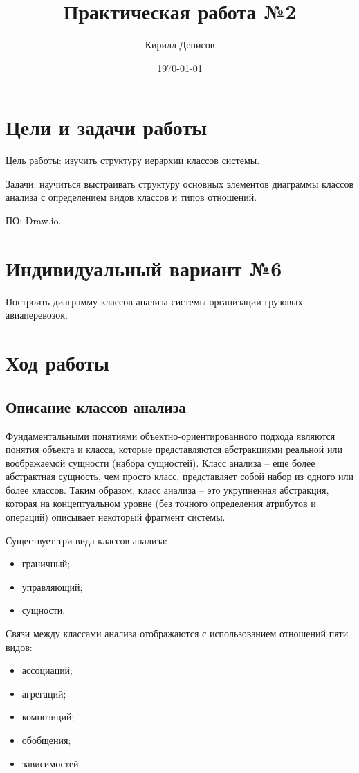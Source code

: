 \documentclass[a4paper,14pt]{extarticle}
\author{Кирилл Денисов}
\title{Практическая работа №2}
\date{\today}
\newcommand{\pathToCommonFolder}{/home/denilai/Desktop/LaTeX/Common}
\begin{document}
\thispagestyle{empty}



\newpage
\tableofcontents
\newpage	
\section{Цели и задачи работы}
Цель работы: изучить структуру иерархии классов системы.

Задачи: научиться выстраивать структуру основных элементов диаграммы
классов анализа с определением видов классов и типов отношений.

ПО: Draw.io.
\section{Индивидуальный вариант №6}
Построить диаграмму классов анализа системы организации грузовых авиаперевозок.
\section{Ход работы}
\subsection{Описание классов анализа}
Фундаментальными понятиями объектно-ориентированного подхода являются понятия объекта и класса, которые представляются абстракциями реальной или воображаемой сущности (набора сущностей). Класс анализа – еще более абстрактная сущность, чем просто класс, представляет собой набор из одного или более классов.
Таким образом, класс анализа – это укрупненная абстракция, которая на концептуальном уровне (без точного определения атрибутов и операций) описывает некоторый фрагмент системы.

Существует три вида классов анализа:
\begin{itemize}
\item граничный;
\item управляющий;
\item сущности.
\end{itemize}

Связи между классами анализа отображаются с использованием
отношений пяти видов:
\begin{itemize}
\item ассоциаций;
\item агрегаций;
\item композиций;
\item обобщения;
\item зависимостей.
\end{itemize}
\end{document}
